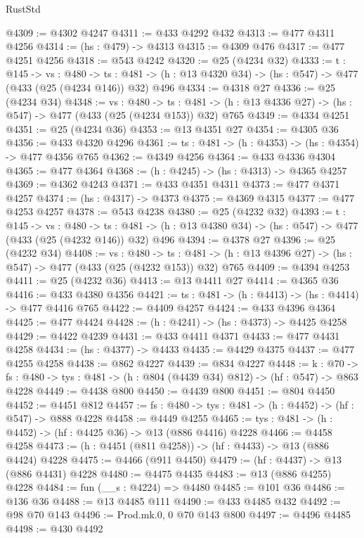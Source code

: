 \begin{lexlean}{RustStd}
\begin{coremodule}
{\begin{coremodule}
{{{{{{{@4309 := @4302 @4247
@4311 := @433 @4292 @432
@4313 := @477 @4311 @4256
@4314 := (hs : @479) -> @4313
@4315 := @4309 @476
@4317 := @477 @4251 @4256
@4318 := @543 @4242
@4320 := @25 (@4234 @32)
@4333 := {t : @145} ->
  {vs : @480} ->
  {ts : @481} -> (h : @13 @4320 @34) -> (hs : @547) -> @477 (@433 (@25 (@4234 @146)) @32) @496
@4334 := @4318 @27
@4336 := @25 (@4234 @34)
@4348 := {vs : @480} ->
  {ts : @481} -> (h : @13 @4336 @27) -> (hs : @547) -> @477 (@433 (@25 (@4234 @153)) @32) @765
@4349 := @4334 @4251
@4351 := @25 (@4234 @36)
@4353 := @13 @4351 @27
@4354 := @4305 @36
@4356 := @433 @4320 @4296
@4361 := {ts : @481} -> (h : @4353) -> (hs : @4354) -> @477 @4356 @765
@4362 := @4349 @4256
@4364 := @433 @4336 @4304
@4365 := @477 @4364
@4368 := (h : @4245) -> (hs : @4313) -> @4365 @4257
@4369 := @4362 @4243
@4371 := @433 @4351 @4311
@4373 := @477 @4371 @4257
@4374 := (hs : @4317) -> @4373
@4375 := @4369 @4315
@4377 := @477 @4253 @4257
@4378 := @543 @4238
@4380 := @25 (@4232 @32)
@4393 := {t : @145} ->
  {vs : @480} ->
  {ts : @481} -> (h : @13 @4380 @34) -> (hs : @547) -> @477 (@433 (@25 (@4232 @146)) @32) @496
@4394 := @4378 @27
@4396 := @25 (@4232 @34)
@4408 := {vs : @480} ->
  {ts : @481} -> (h : @13 @4396 @27) -> (hs : @547) -> @477 (@433 (@25 (@4232 @153)) @32) @765
@4409 := @4394 @4253
@4411 := @25 (@4232 @36)
@4413 := @13 @4411 @27
@4414 := @4365 @36
@4416 := @433 @4380 @4356
@4421 := {ts : @481} -> (h : @4413) -> (hs : @4414) -> @477 @4416 @765
@4422 := @4409 @4257
@4424 := @433 @4396 @4364
@4425 := @477 @4424
@4428 := (h : @4241) -> (hs : @4373) -> @4425 @4258
@4429 := @4422 @4239
@4431 := @433 @4411 @4371
@4433 := @477 @4431 @4258
@4434 := (hs : @4377) -> @4433
@4435 := @4429 @4375
@4437 := @477 @4255 @4258
@4438 := @862 @4227
@4439 := @834 @4227
@4448 := {k : @70} ->
  {fs : @480} -> {tys : @481} -> (h : @804 (@4439 @34) @812) -> (hf : @547) -> @863 @4228
@4449 := @4438 @800
@4450 := @4439 @800
@4451 := @804 @4450
@4452 := @4451 @812
@4457 := {fs : @480} -> {tys : @481} -> (h : @4452) -> (hf : @547) -> @888 @4228
@4458 := @4449 @4255
@4465 := {tys : @481} -> (h : @4452) -> (hf : @4425 @36) -> @13 (@886 @4416) @4228
@4466 := @4458 @4258
@4473 := (h : @4451 (@811 @4258)) -> (hf : @4433) -> @13 (@886 @4424) @4228
@4475 := @4466 (@911 @4450)
@4479 := (hf : @4437) -> @13 (@886 @4431) @4228
@4480 := @4475 @4435
@4483 := @13 (@886 @4255) @4228
@4484 := fun (__s : @4224) => @4480
@4485 := @101 @36
@4486 := @136 @36
@4488 := @13 @4485 @111
@4490 := @433 @4485 @432
@4492 := @98 @70 @143
@4496 := Prod.mk.{0, 0} @70 @143 @800
@4497 := @4496 @4485
@4498 := @430 @4492
}}}}}}}
\end{coremodule}}
\end{coremodule}
\end{lexlean}

